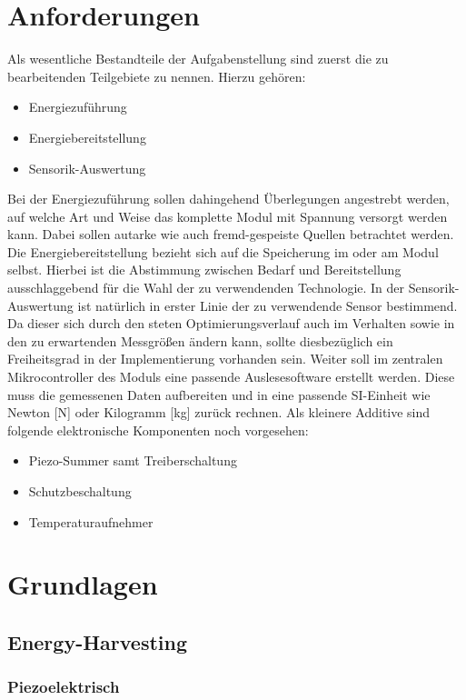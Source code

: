 \documentclass[12pt]{scrreprt} %
\begin{document}
\chapter{Anforderungen}
Als wesentliche Bestandteile der Aufgabenstellung sind zuerst die zu bearbeitenden Teilgebiete zu nennen. Hierzu gehören:
\begin{itemize}
\item
Energiezuführung
\item
Energiebereitstellung
\item
Sensorik-Auswertung
\end{itemize}
Bei der Energiezuführung sollen dahingehend Überlegungen angestrebt werden, auf welche Art und Weise das komplette Modul mit Spannung versorgt werden kann. Dabei sollen autarke wie auch fremd-gespeiste Quellen betrachtet werden. Die Energiebereitstellung bezieht sich auf die Speicherung im oder am Modul selbst. Hierbei ist die Abstimmung zwischen Bedarf und Bereitstellung ausschlaggebend für die Wahl der zu verwendenden Technologie. In der Sensorik-Auswertung ist natürlich in erster Linie der zu verwendende Sensor bestimmend. Da dieser sich durch den steten Optimierungsverlauf auch im Verhalten sowie in den zu erwartenden Messgrößen ändern kann, sollte diesbezüglich ein Freiheitsgrad in der Implementierung vorhanden sein. Weiter soll im zentralen Mikrocontroller des Moduls eine passende Auslesesoftware erstellt werden. Diese muss die gemessenen Daten aufbereiten und in eine passende SI-Einheit wie Newton [N] oder Kilogramm [kg] zurück rechnen. Als kleinere Additive sind folgende elektronische Komponenten noch vorgesehen: 
\begin{itemize}
\item
Piezo-Summer samt Treiberschaltung
\item
Schutzbeschaltung
\item
Temperaturaufnehmer
\end{itemize}
\chapter{Grundlagen}
\section{Energy-Harvesting}
\subsection{Piezoelektrisch}
\end{document}
